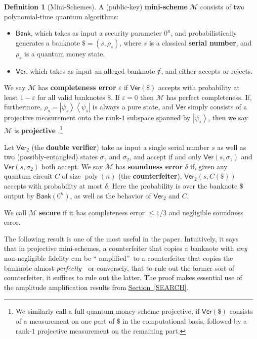 \documentclass[10pt]{article}
\theoremstyle{definition}
\newtheorem{definition}[theorem]{Definition}
\numberwithin{equation}{section}
\newcommand{\expref}[2]{\texorpdfstring{\hyperref[#2]{#1~\ref{#2}}}{#1~\ref{#2}}}
\begin{document}
\begin{definition}
[Mini-Schemes]\label{minischeme}A (public-key)\textbf{ mini-scheme}
$\mathcal{M}$ consists of two polynomial-time quantum algorithms:

\begin{itemize}
\item $\mathsf{Bank}$, which takes as input a security parameter $0^{n}$, and
probabilistically generates a banknote $\$=\left(  s,\rho_{s}\right)  $, where
$s$ is a classical \textbf{serial number}, and $\rho_{s}$ is a quantum money state.

\item $\mathsf{Ver}$, which takes as input an alleged banknote $%
%
%
\hbox{\rm\rlap/c}%
%
$, and either accepts or rejects.
\end{itemize}

We say $\mathcal{M}$ has \textbf{completeness error} $\varepsilon$ if
$\mathsf{Ver}\left(  \$\right)  $ accepts with probability at least
$1-\varepsilon$ for all valid banknotes $\$$. If $\varepsilon=0$ then
$\mathcal{M}$ has perfect completeness. If, furthermore, $\rho
_{s}=\left\vert \psi_{s}\right\rangle \left\langle \psi_{s}\right\vert $ is
always a pure state, and $\mathsf{Ver}$ simply consists of a projective
measurement onto the rank-$1$ subspace spanned by $\left\vert \psi
_{s}\right\rangle $, then we say $\mathcal{M}$ is \textbf{projective}%
.\footnote{We similarly call a full quantum money scheme projective, if
$\mathsf{Ver}\left(  \$\right)  $ consists of a measurement on one part of
$\$$ in the computational basis, followed by a rank-$1$ projective measurement
on the remaining part.}

Let $\mathsf{Ver}_{2}$ (the \textbf{double verifier}) take as input a single
serial number $s$ as well as two (possibly-entangled) states $\sigma_{1}$ and
$\sigma_{2}$, and accept if and only $\mathsf{Ver}\left(  s,\sigma_{1}\right)
$ and $\mathsf{Ver}\left(  s,\sigma_{2}\right)  $ both accept. We say
$\mathcal{M}$ has \textbf{soundness error} $\delta$ if, given any quantum
circuit $C$ of size $\operatorname*{poly}\left(  n\right)  $ (the
\textbf{counterfeiter}), $\mathsf{Ver}_{2}\left(  s,C\left(  \$\right)
\right)  $ accepts with probability at most $\delta$. Here the probability
is over the banknote $\$$ output by $\mathsf{Bank}\left(  0^{n}\right)  $, as
well as the behavior of $\mathsf{Ver}_{2}$ and $C$.

We call $\mathcal{M}$ \textbf{secure} if it has completeness error $\leq
1/3$ and negligible soundness error.{}
\end{definition}
\setcounter{theorem}{4}
The following result is one of the most useful in the paper. Intuitively, it
says that in projective mini-schemes, a counterfeiter that copies a banknote
with \emph{any} non-negligible fidelity can be \textquotedblleft
amplified\textquotedblright\ to a counterfeiter that copies the banknote
almost \emph{perfectly}---or conversely, that to rule out the former sort of
counterfeiter, it suffices to rule out the latter. The proof makes essential
use of the amplitude amplification results from \expref{Section}{SEARCH}.
\end{document}
